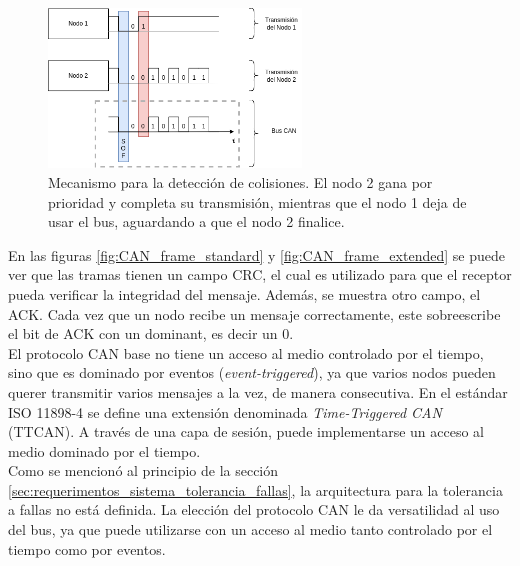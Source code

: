 \begin{figure}[H]
    \centering
    \includegraphics[width=0.6\textwidth]{img/CAN_arbitration.png}
    \caption{Mecanismo para la detección de colisiones. El nodo 2 gana por prioridad y completa su transmisión, mientras que el nodo 1 deja de usar el bus, aguardando a que el nodo 2 finalice.}
    \label{fig:CAN_arbitration}
\end{figure}

En las figuras \ref{fig:CAN_frame_standard} y \ref{fig:CAN_frame_extended} se puede ver que las tramas tienen un campo CRC, el cual es utilizado para que el receptor pueda verificar la integridad del mensaje. Además, se muestra otro campo, el ACK. Cada vez que un nodo recibe un mensaje correctamente, este sobreescribe el bit de ACK con un dominant, es decir un 0.\\

El protocolo CAN base no tiene un acceso al medio controlado por el tiempo, sino que es dominado por eventos (\textit{event-triggered}), ya que varios nodos pueden querer transmitir varios mensajes a la vez, de manera consecutiva. En el estándar ISO 11898-4\cite{ISO11898_4} se define una extensión denominada \textit{Time-Triggered CAN} (TTCAN). A través de una capa de sesión, puede implementarse un acceso al medio dominado por el tiempo.\\

Como se mencionó al principio de la sección \ref{sec:requerimentos_sistema_tolerancia_fallas}, la arquitectura para la tolerancia a fallas no está definida. La elección del protocolo CAN le da versatilidad al uso del bus, ya que puede utilizarse con un acceso al medio tanto controlado por el tiempo como por eventos.